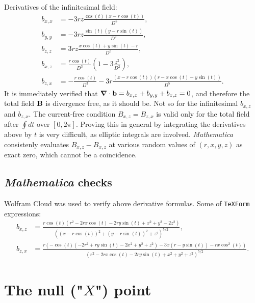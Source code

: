 \documentclass[10pt]{article}
\newcommand{\bfb}{{\bf b}}
\newcommand{\bfB}{{\bf B}}
\newcommand{\bfna}{{\mbox{\boldmath $\bf\nabla$}}}
\begin{document}
Derivatives of the infinitesimal field:
\begin{equation}
\begin{aligned}
b_{x,x} &= -3rz\frac{\cos(t)(x-r\cos(t))}{D^5},\\
b_{y,y} &= -3rz\frac{\sin(t)(y-r\sin(t))}{D^5},\\
b_{z,z} &=  3rz\frac{x\cos(t) + y\sin(t) - r}{D^5},\\
b_{x,z} &=  \frac{r\cos(t)}{D^3}\left(1-3\frac{z^2}{D^2}\right),\\
b_{z,x} &= -\frac{r\cos(t)}{D^3} -3r\frac{(x-r\cos(t))(r-x\cos(t)-y\sin(t))}{D^5}.
\end{aligned}
\end{equation}
It is immediately verified that
$\bfna\cdot\bfb=b_{x,x}+b_{y,y}+b_{z,z}=0$, and therefore the total
field $\bfB$ is divergence free, as it should be.  Not so for the
infinitesimal $b_{x,z}$ and $b_{z,x}$.  The current-free condition
$B_{x,z}=B_{z,x}$ is valid only for the total field after $\oint dt$
over $[0,2\pi]$.  Proving this in general by integrating the
derivatives above by $t$ is very difficult, as elliptic integrals are
involved.  {\sl Mathematica} consistenly evaluates $B_{x,z}-B_{x,z}$ at
various random values of $(r,x,y,z)$ as exact zero, which cannot be a
coincidence.

\subsection{{\sl Mathematica} checks}

Wolfram Cloud was used to verify above derivative formulas.  Some of
{\tt TeXForm} expressions:
\begin{equation}
\begin{aligned}
b_{x,z} &= \frac{r \cos (t) \left(r^2-2 r x \cos (t)-2 r y \sin (t)+x^2+y^2-2
   z^2\right)}{\left((x-r \cos (t))^2+(y-r \sin (t))^2+z^2\right)^{5/2}},\\
b_{z,x} &= \frac{r\left(-\cos(t)\left(-2r^2+ry\sin(t)-2x^2+y^2+z^2\right)-3x(r-y\sin(t))-rx\cos^2(t)\right)}{\left(r^2-2rx\cos(t)-2ry\sin(t)+x^2+y^2+z^2\right)^{5/2}}.
\end{aligned}
\end{equation}

\section{The null ("$X$") point}
\end{document}

